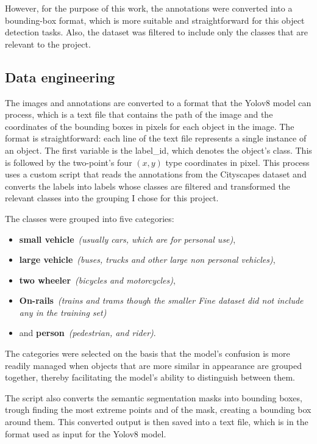 However, for the purpose of this work, the annotations were converted into a bounding-box format,
which is more suitable and straightforward for this object detection tasks.
Also, the dataset was filtered to include only the classes that are relevant to the project.

\subsection{Data engineering} \label{subsec:data-management}
The images and annotations are converted to a format that the Yolov8 model can process, which is
a text file that contains the path of the image and the coordinates of the bounding boxes in pixels for each object in the image.
The format is straightforward: each line of the text file represents a single instance of an object.
The first variable is the label\_id, which denotes the object's class.
This is followed by the two-point's four \((x, y)\) type coordinates in pixel.
This process uses a custom script that reads the annotations from the Cityscapes dataset and converts the labels
into labels whose classes are filtered and transformed the relevant classes into the grouping I chose for this project.

The classes were grouped into five categories:
\begin{itemize}
    \item \textbf{small vehicle}~\textit{(usually cars, which are for personal use)},
    \item \textbf{large vehicle}~\textit{(buses, trucks and other large non personal vehicles)},
    \item \textbf{two wheeler}~\textit{(bicycles and motorcycles)},
    \item \textbf{On-rails}~\textit{(trains and trams though the smaller Fine dataset did not include any in the training set)}
    \item and \textbf{person}~\textit{(pedestrian, and rider)}.
\end{itemize}

The categories were selected on the basis that the model's confusion is more readily managed when objects
that are more similar in appearance are grouped together, thereby facilitating the model's ability to
distinguish between them.

The script also converts the semantic segmentation masks into bounding boxes, trough finding the most
extreme points and of the mask, creating a bounding box around them.
This converted output is then saved into a text file, which is in the format used as input for the Yolov8 model.


